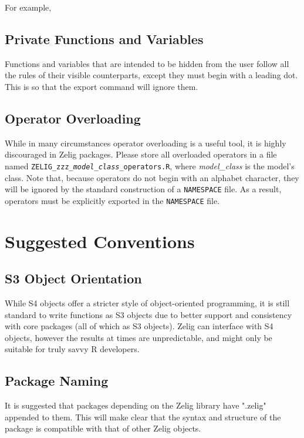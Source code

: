 \documentclass[a4paper,10pt]{article}
\begin{document}
For example, 



\subsection{Private Functions and Variables}
Functions and variables that are intended to be hidden from the user follow all the rules of their visible counterparts, except they must begin with a leading dot.  This is so that the export command will ignore them.



\subsection{Operator Overloading}
While in many circumstances operator overloading is a useful tool, it is highly discouraged in Zelig packages.  Please store all overloaded operators in a file named {\tt ZELIG\_zzz\_\emph{model\_class}\_operators.R}, where \emph{model\_class} is the model's class.  Note that, because operators do not begin with an alphabet character, they will be ignored by the standard construction of a {\tt NAMESPACE} file.  As a result, operators must be explicitly exported in the {\tt NAMESPACE} file.



\section{Suggested Conventions}


\subsection{S3 Object Orientation}
While S4 objects offer a stricter style of object-oriented programming, it is still standard to write functions as S3 objects due to better support and consistency with core packages (all of which as S3 objects).  Zelig can interface with S4 objects, however the results at times are unpredictable, and might only be suitable for truly savvy R developers.



\subsection{Package Naming}
It is suggested that packages depending on the Zelig library have ".zelig" appended to them.  This will make clear that the syntax and structure of the package is compatible with that of other Zelig objects.
\end{document}
